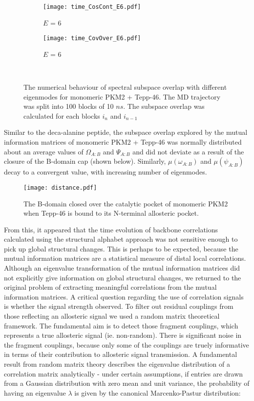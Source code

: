 \documentclass[11pt]{article}
\begin{document}
\begin{figure}[hbt]
\begin{subfigure}[b]{.24\linewidth}
  \end{subfigure}%
  \begin{subfigure}[b]{.24\linewidth}
    \centering
    \texttt{[image: time\_CosCont\_E6.pdf]}
    \caption{$E$ = 6}\label{fig:1k}
  \end{subfigure}%
  \begin{subfigure}[b]{.24\linewidth}
    \centering
    \texttt{[image: time\_CovOver\_E6.pdf]}
    \caption{$E$ = 6}\label{fig:1l}
  \end{subfigure}\\%
\caption{The numerical behaviour of spectral subspace overlap with different eigenmodes for monomeric PKM2 + Tepp-46. The MD trajectory was split into 100 blocks of 10 $ns$. The subspace overlap was calculated for each blocks $i_{n}$ and $i_{n-1}$}\label{fig:1}
\end{figure}
Similar to the deca-alanine peptide, the subspace overlap explored by the mutual information matrices of monomeric PKM2 + Tepp-46 was normally distributed about an average values of $ \Omega_{A:B} $ and $ \Psi_{A:B} $ and did not deviate as a result of the closure of the B-domain cap (shown below). Similarly, $\mu (\omega_{A:B}) $ and $\mu (\psi_{A:B}) $ decay to a convergent value, with increasing number of eigenmodes.
\begin{figure}[!ht]
\centering
\texttt{[image: distance.pdf]}
\caption{The B-domain closed over the catalytic pocket of monomeric PKM2 when Tepp-46 is bound to its N-terminal allosteric pocket.}\label{fig:2} 
\end{figure}
From this, it appeared that the time evolution of backbone correlations calculated using the structural alphabet approach was not sensitive enough to pick up global structural changes. This is perhaps to be expected, because the mutual information matrices are a statistical measure of distal local correlations. Although an eigenvalue transformation of the mutual information matrices did not explicitly give information on global structural changes, we returned to the original problem of extracting meaningful correlations from the mutual information matrices. A critical question regarding the use of correlation signals is whether the signal strength observed. To filter out residual couplings from those reflecting an allosteric signal we used a random matrix theoretical framework. The fundamental aim is to detect those fragment couplings, which represents a true allosteric signal (ie. non-random). There is significant noise in the fragment couplings, because only some of the couplings are truely informative in terms of their contribution to allosteric signal transmission. A fundamental result from random matrix theory describes the eigenvalue distribution of a correlation matrix analytically - under certain assumptions, if entries are drawn from a Gaussian distribution with zero mean and unit variance, the probability of having an eigenvalue $\lambda$ is given by the canonical Marcenko-Pastur distribution:
\end{document}
